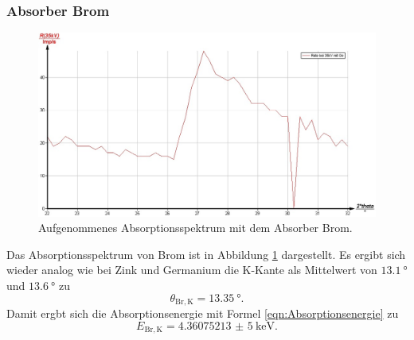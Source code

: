 \subsubsection{Absorber Brom}
\begin{figure}
	\includegraphics[width=1.0\textwidth]{nIKO_und_jULIAN_ÜLADS/brom.jpg}
	\caption{Aufgenommenes Absorptionsspektrum mit dem Absorber Brom.}
	\label{fig:brom_absorber}
\end{figure}
Das Absorptionsspektrum von Brom ist in Abbildung \ref{fig:brom_absorber} dargestellt.
Es ergibt sich wieder analog wie bei Zink und Germanium die K-Kante als Mittelwert von 
$\SI{13,1}{\degree}$ und $\SI{13,6}{\degree}$ zu
\begin{equation*}
	\theta_{\mathrm{Br,K}} = \SI{13,35}{\degree} \mathrm{.}
\end{equation*}
Damit ergbt sich die Absorptionsenergie mit Formel \eqref{eqn:Absorptionsenergie} zu
\begin{equation*}
	E_{\mathrm{Br,K}} = \SI{4,36075213(5)}{\kilo\electronvolt} \mathrm{.}
\end{equation*}

\FloatBarrier

